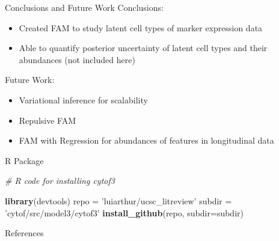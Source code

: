 \documentclass[ignorenonframetext,]{beamer}
\newif\ifbibliography
\newenvironment{Shaded}{}{}
\newcommand{\KeywordTok}[1]{\textcolor[rgb]{0.00,0.44,0.13}{\textbf{{#1}}}}
\newcommand{\DataTypeTok}[1]{\textcolor[rgb]{0.56,0.13,0.00}{{#1}}}
\newcommand{\StringTok}[1]{\textcolor[rgb]{0.25,0.44,0.63}{{#1}}}
\newcommand{\CommentTok}[1]{\textcolor[rgb]{0.38,0.63,0.69}{\textit{{#1}}}}
\newcommand{\NormalTok}[1]{{#1}}
\begin{document}
\begin{frame}{Conclusions and Future Work}
  Conclusions:
  \vspace{.5em}
  \begin{itemize}
    \setlength\itemsep{1em}
    \item Created FAM to study latent cell types of marker expression data
    \item Able to quantify posterior uncertainty of latent cell types and their abundances (not included here)
  \end{itemize}
  \vspace{1em}

  Future Work:
  \vspace{.5em}
  \begin{itemize}
    \setlength\itemsep{1em}
    \item Variational inference for scalability
    \item Repulsive FAM
    \item FAM with Regression for abundances of features in longitudinal data
  \end{itemize}
\end{frame}


\begin{frame}[fragile]{R Package}
\begin{Shaded}
\begin{Highlighting}[]
\CommentTok{# R code for installing cytof3}

\KeywordTok{library}\NormalTok{(devtools)}
\NormalTok{repo =}\StringTok{ 'luiarthur/ucsc_litreview'}
\NormalTok{subdir =}\StringTok{ 'cytof/src/model3/cytof3'}
\KeywordTok{install_github}\NormalTok{(repo, }\DataTypeTok{subdir=}\NormalTok{subdir)}
\end{Highlighting}
\end{Shaded}
\end{frame}

\appendix
\begin{frame}[allowframebreaks]{References}
\bibliographytrue

\end{frame}
\end{document}
